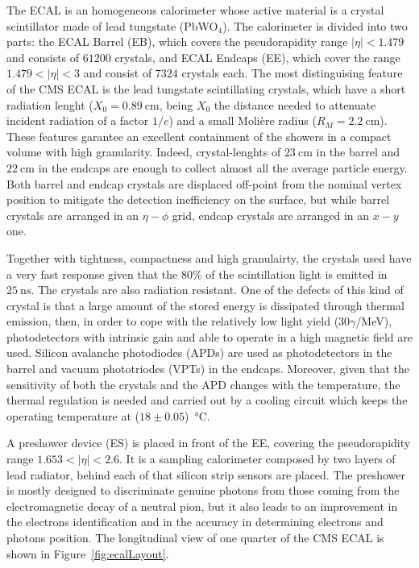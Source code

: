 The ECAL is an homogeneous calorimeter whose active material is a crystal scintillator 
made of lead tungstate (PbWO$_4$). The calorimeter is divided into two parts: 
the ECAL Barrel (EB), which covers the pseudorapidity range $|\eta|< 1.479$
and consists of $61200$ crystals, and ECAL Endcaps (EE), which cover the range $1.479<|\eta|<3$ and consist of $7324$ crystals each.
The most distinguising feature of the CMS ECAL is the lead tungstate scintillating crystals, which
have a short radiation lenght ($X_0=0.89~\si{\cm}$, being $X_0$ the distance needed to attenuate incident 
radiation of a factor $1/e$) and a small Moli\`ere radius ($R_M=2.2~\si{\cm}$). These
features garantee an excellent containment of the showers in a compact volume with high granularity.
Indeed, crystal-lenghts of $23~\si{\cm}$ in the barrel and $22~\si{\cm}$ in the endcaps are enough
to collect almost all the average particle energy. Both barrel and endcap crystals are
displaced off-point from the nominal vertex position to mitigate the detection inefficiency
on the surface, but while barrel crystals are arranged in an $\eta-\phi$ grid, endcap crystals are arranged in an $x-y$ one.

Together with tightness, compactness and high granulairty, the crystals used have a very fast response
given that the 80\% of the scintillation light is emitted in $25~\si{\ns}$. The crystals are also radiation resistant. 
One of the defects of this kind of crystal is that a large amount
of the stored energy is dissipated through thermal emission, then, in order to cope with the relatively low light yield 
($30\gamma$/\si{\MeV}), photodetectors with intrinsic gain and able to operate in a high magnetic field are used.
Silicon avalanche photodiodes (APDs) are used as photodetectors in the barrel and
vacuum phototriodes (VPTs) in the endcaps. Moreover, given that the sensitivity of both the crystals
and the APD changes with the temperature, the thermal regulation is needed and carried out by a cooling circuit which 
keeps the operating temperature at ($18\pm0.05$)~\si{\degreeCelsius}. 

A preshower device (ES) is placed in front of the EE, covering the pseudorapidity range 
$1.653<|\eta|<2.6$. It is a sampling calorimeter composed by two layers of
lead radiator, behind each of that silicon strip sensors are placed.
The preshower is mostly designed to discriminate genuine photons from those
coming from the electromagnetic decay of a neutral pion, but it also leads to an improvement in the 
electrons identification and in the accuracy in determining electrons and photons position.
The longitudinal view of one quarter of the CMS ECAL is shown in Figure~\ref{fig:ecalLayout}.

